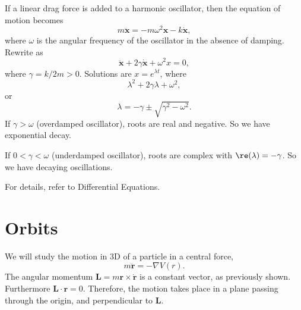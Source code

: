 \documentclass[a4paper]{article}
\begin{document}
\begin{eg}
  If a linear drag force is added to a harmonic oscillator, then the equation of motion becomes
  \[
    m\ddot{\mathbf{x}} = -m\omega^2 \mathbf{x} - k\dot{\mathbf{x}},
  \]
  where $\omega$ is the angular frequency of the oscillator in the absence of damping. Rewrite as
  \[
    \ddot{\mathbf{x}} + 2\gamma \dot{\mathbf{x}} + \omega^2 x = 0,
  \]
  where $\gamma = k/2m > 0$. Solutions are $x = e^{\lambda t}$, where
  \[
    \lambda^2 + 2\gamma \lambda + \omega^2,
  \]
  or
  \[
    \lambda = -\gamma \pm \sqrt{\gamma^2 - \omega^2}.
  \]
  If $\gamma > \omega$ (overdamped oscillator), roots are real and negative. So we have exponential decay.

  If $0 < \gamma < \omega$ (underdamped oscillator), roots are complex with $\re(\lambda) = -\gamma$. So we have decaying oscillations.

  For details, refer to Differential Equations.
\end{eg}

\section{Orbits}
We will study the motion in 3D of a particle in a central force,
\[
  m\ddot{\mathbf{r}} = -\nabla V(r).
\]
The angular momentum $\mathbf{L} = m\mathbf{r}\times \dot{\mathbf{r}}$ is a constant vector, as previously shown. Furthermore $\mathbf{L}\cdot \mathbf{r} = 0$. Therefore, the motion takes place in a plane passing through the origin, and perpendicular to $\mathbf{L}$.
\end{document}
